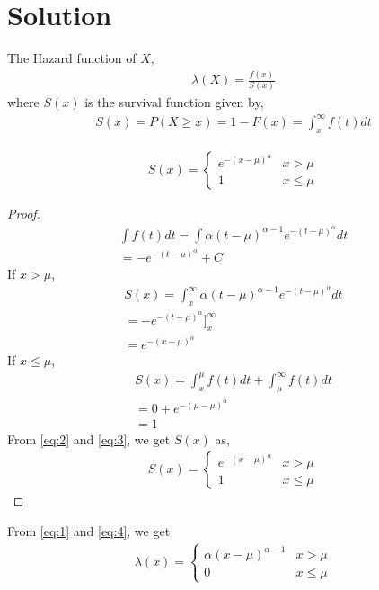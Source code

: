 \documentclass[journal,12pt,twocolumn]{IEEEtran}
\begin{document}
\section*{\textbf{Solution}}
The Hazard function of $X$,
\begin{align}
\lambda(X) = \frac{f(x)}{S(x)} \label{eq:1}
\end{align}
where $S(x)$ is the survival function given by,
\begin{align}
S(x) = P(X \geq x) = 1-F(x) = \int_{x}^{\infty}f(t)dt
\end{align}
\begin{lemma}
\begin{align}
S(x)=
\begin{cases}
e^{-(x-\mu)^\alpha} &x>\mu\\
1 &x\leq\mu
\end{cases}
\end{align}
\end{lemma}
\begin{proof}

\begin{align}
\int f(t)dt=\int \alpha(t-\mu)^{\alpha-1}e^{-(t-\mu)^\alpha}dt\\
=-e^{-(t-\mu)^\alpha} + C
\end{align}
If $x>\mu$, 
\begin{align}
S(x) = \int_{x}^{\infty} \alpha(t-\mu)^{\alpha-1}e^{-(t-\mu)^\alpha}dt\\
=-e^{-(t-\mu)^\alpha}]_{x}^{\infty}\\
=e^{-(x-\mu)^{\alpha}} \label{eq:2}
\end{align}
If $x\leq\mu$,
\begin{align}
S(x) = \int_{x}^{\mu}f(t)dt + \int_{\mu}^{\infty}f(t)dt\\
     = 0 + e^{-(\mu-\mu)^{\alpha}}\\
     =1 \label{eq:3}
\end{align}
From \eqref{eq:2} and \eqref{eq:3}, we get $S(x)$ as,
\begin{align}
S(x)=
\begin{cases}
e^{-(x-\mu)^\alpha} &x>\mu\\
1 &x\leq\mu \label{eq:4}
\end{cases}
\end{align}
\end{proof}
From \eqref{eq:1} and \eqref{eq:4}, we get
\begin{align}
\lambda(x) = 
\begin{cases}
\alpha(x-\mu)^{\alpha-1} &x>\mu\\
0 &x\leq\mu \label{eq:5}
\end{cases}
\end{align}
\end{document}
